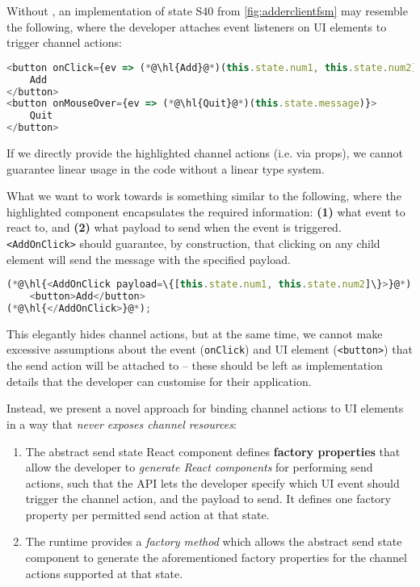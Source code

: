 Without ,
an implementation of state S40 from \cref{fig:adderclientfsm}
may resemble the following, where the developer attaches
event listeners on UI elements to trigger channel actions:

\begin{lstlisting}[language=javascript,numbers=none]
<button onClick={ev => (*@\hl{Add}@*)(this.state.num1, this.state.num2)}>
	Add
</button>
<button onMouseOver={ev => (*@\hl{Quit}@*)(this.state.message)}>
	Quit
</button>
\end{lstlisting}

If we directly provide the highlighted channel actions 
(i.e. via props), we cannot guarantee linear usage in the code 
without a linear type system.

What we want to work towards is something similar to the following,
where the highlighted component encapsulates the required information: 
\textbf{(1)} what event to react to, 
and \textbf{(2)} what payload to send when the event is triggered.
\texttt{<AddOnClick>} should guarantee, by construction,
that clicking on any child element will send the 
message with the specified payload.

\begin{lstlisting}[language=javascript,numbers=none]
(*@\hl{<AddOnClick payload=\{[this.state.num1, this.state.num2]\}>}@*)
	<button>Add</button>
(*@\hl{</AddOnClick>}@*);
\end{lstlisting}

This elegantly hides channel actions, but at the same time,
we cannot make excessive assumptions about the 
event (\texttt{onClick}) and UI element (\texttt{<button>})
that the send action will be attached to --
these should be left as implementation details that 
the developer can customise for their application.

Instead, we present a novel approach for binding
channel actions to UI elements in a way that \textit{never
exposes channel resources}:

\begin{enumerate}
\item
The abstract send state React component defines
\textbf{factory properties}
that allow the developer to \textit{generate React components}
for performing send actions, such that the API lets the developer
specify which UI event should trigger the channel action,
and the payload to send. It defines one factory property per
permitted send action at that state.

\item
The runtime provides a \textit{factory method}
which allows the abstract send state component to
generate the aforementioned factory properties
for the channel actions supported at that state.
\end{enumerate}

